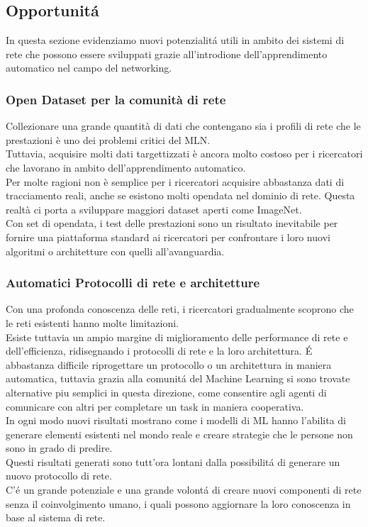 \documentclass[../tesi.tex]{subfiles}
\begin{document}
\subsection{Opportunitá}
In questa sezione evidenziamo nuovi potenzialitá utili in ambito dei sistemi di rete che possono essere sviluppati grazie all'introdione dell'apprendimento automatico nel campo del networking.

\subsubsection{Open Dataset per la comunità di rete}
Collezionare una grande quantità di dati che contengano sia i profili di rete che le prestazioni è uno dei problemi critici del MLN.\\
Tuttavia, acquisire molti dati targettizzati è ancora molto costoso per i ricercatori che lavorano in ambito dell’apprendimento automatico.\\
Per molte ragioni non è semplice per i ricercatori acquisire abbastanza dati di tracciamento reali, anche se esistono molti \Gls{opendata} nel dominio di rete.
Questa realtà ci porta a sviluppare maggiori dataset aperti come ImageNet.\\
Con set di \Gls{opendata}, i test delle prestazioni sono un risultato inevitabile per fornire una piattaforma standard ai ricercatori per confrontare i loro nuovi algoritmi o architetture con quelli all’avanguardia.

\subsubsection{Automatici Protocolli di rete e architetture}

Con una profonda conoscenza delle reti, i ricercatori gradualmente scoprono che le reti esistenti hanno molte limitazioni.\\
Esiste tuttavia un ampio margine di miglioramento delle performance di rete e dell'efficienza, ridisegnando i protocolli di rete e la loro architettura. É abbastanza difficile riprogettare un protocollo o un architettura in maniera automatica, tuttavia grazia alla comunitá del Machine Learning si sono trovate alternative piu semplici in questa direzione, come consentire agli agenti di comunicare con altri per completare un task in maniera cooperativa.\\
In ogni modo nuovi risultati mostrano come i modelli di ML hanno l’abilita di generare elementi esistenti nel mondo reale e creare strategie che le persone non sono in grado di predire.\\
Questi risultati generati sono tutt’ora lontani dalla possibilitá di generare un nuovo protocollo di rete.\\
C'é un grande potenziale e una grande volontá di creare nuovi componenti di rete senza il coinvolgimento umano, i quali possono aggiornare la loro conoscenza in base al sistema di rete.
\newpage
\end{document}
